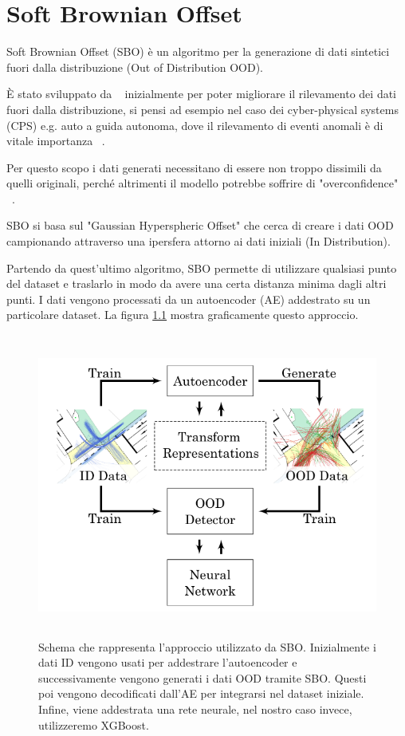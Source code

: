 \chapter{Soft Brownian Offset}

Soft Brownian Offset (SBO) è un algoritmo per la generazione di dati sintetici fuori dalla distribuzione (Out of Distribution OOD). 

È stato sviluppato da ~\cite{sbo} inizialmente per poter migliorare il rilevamento dei dati fuori dalla distribuzione, si pensi ad esempio nel caso dei cyber-physical systems (CPS) e.g. auto a guida autonoma, dove il rilevamento di eventi anomali è di vitale importanza ~\cite{yuhasEmbeddedOutofdistributionDetection2021}.

Per questo scopo i dati generati necessitano di essere non troppo dissimili da quelli originali, perché altrimenti il modello potrebbe soffrire di "overconfidence" ~\cite{amodeiConcreteProblemsAI2016}.

SBO si basa sul "Gaussian Hyperspheric Offset" che cerca di creare i dati OOD campionando attraverso una ipersfera attorno ai dati iniziali (In Distribution).

Partendo da quest'ultimo algoritmo, SBO permette di utilizzare qualsiasi punto del dataset e traslarlo in modo da avere una certa distanza minima dagli altri punti. I dati vengono processati da un autoencoder (AE) addestrato su un particolare dataset. La figura \ref{fig:sbo_schema} mostra graficamente questo approccio. 


\begin{figure}[htpb]
    \centering
    \includegraphics[width=\textwidth,height=10cm,keepaspectratio=true]{img/sbo_schema.png}
    \caption{
        Schema che rappresenta l'approccio utilizzato da SBO. Inizialmente i dati ID vengono usati per addestrare l'autoencoder e successivamente vengono generati i dati OOD tramite SBO. Questi poi vengono decodificati dall'AE per integrarsi nel dataset iniziale. Infine, viene addestrata una rete neurale, nel nostro caso invece, utilizzeremo XGBoost.
    }
    \label{fig:sbo_schema}
\end{figure}


